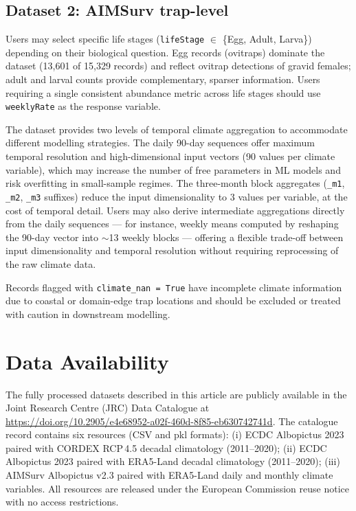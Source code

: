 \documentclass[11pt]{article}
\begin{document}
\subsection*{Dataset 2: AIMSurv trap-level}
Users may select specific life stages (\texttt{lifeStage} $\in$ 
\{Egg, Adult, Larva\}) depending on their biological question. Egg 
records (ovitraps) dominate the dataset (13,601 of 15,329 records) and 
reflect ovitrap detections of gravid females; adult and larval counts provide 
complementary, sparser information. Users requiring a single consistent abundance metric across 
life stages should use \texttt{weeklyRate} as the response variable.

The dataset provides two levels of temporal climate aggregation to 
accommodate different modelling strategies. The daily 90-day sequences 
offer maximum temporal resolution and high-dimensional input 
vectors (90 values per climate variable), which may increase the number 
of free parameters in ML models and risk overfitting in small-sample 
regimes. The three-month block aggregates (\texttt{\_m1}, \texttt{\_m2}, 
\texttt{\_m3} suffixes) reduce the input dimensionality to 3 values per 
variable, at the cost of temporal detail. Users may also derive 
intermediate aggregations directly from the daily sequences --- for 
instance, weekly means computed by reshaping the 90-day vector into 
$\sim$13 weekly blocks --- offering a flexible trade-off between 
input dimensionality and temporal resolution without requiring 
reprocessing of the raw climate data.

Records flagged with \texttt{climate\_nan~=~True} have incomplete 
climate information due to coastal or domain-edge trap locations and 
should be excluded or treated with caution in downstream modelling.

\section*{Data Availability}

The fully processed datasets described in this article are publicly 
available in the Joint Research Centre (JRC) Data Catalogue 
\cite{aedes_dataset_jrc} at 
\url{https://doi.org/10.2905/e4e68952-a02f-460d-8f85-eb630742741d}. 
The catalogue record contains six resources (CSV and pkl formats):
(i) ECDC Albopictus 2023 paired with CORDEX RCP\,4.5 decadal 
climatology (2011--2020);
(ii) ECDC Albopictus 2023 paired with ERA5-Land decadal climatology 
(2011--2020);
(iii) AIMSurv Albopictus v2.3 paired with ERA5-Land daily and monthly 
climate variables.
All resources are released under the European Commission reuse notice 
with no access restrictions.
\end{document}
